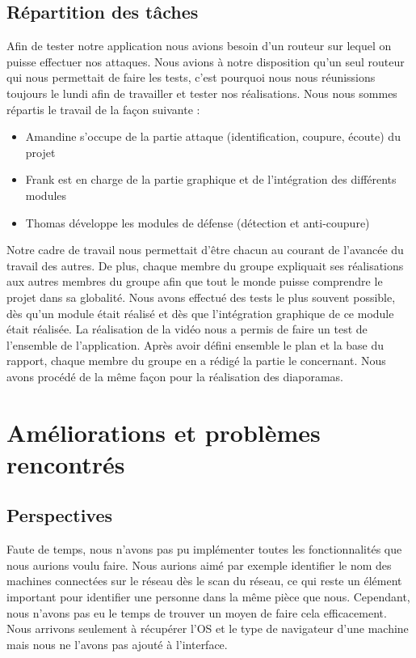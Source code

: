 \documentclass[11pt]{article}
\begin{document}
\subsection{Répartition des tâches}
Afin de tester notre application nous avions besoin d'un routeur sur lequel on puisse effectuer nos attaques. Nous avions à notre disposition qu'un seul routeur qui nous permettait de faire les tests, c'est pourquoi nous nous réunissions toujours le lundi afin de travailler et tester nos réalisations.
Nous nous sommes répartis le travail de la façon suivante :  
\begin{itemize}
	\item Amandine s'occupe de la partie attaque (identification, coupure, écoute) du projet
	\item Frank est en charge de la partie graphique et de l'intégration des différents modules
	\item Thomas développe les modules de défense (détection et anti-coupure)
\end{itemize}
Notre cadre de travail nous permettait d'être chacun au courant de l'avancée du travail des autres. De plus, chaque membre du groupe expliquait ses réalisations aux autres membres du groupe afin que tout le monde puisse comprendre le projet dans sa globalité.
Nous avons effectué des tests le plus souvent possible, dès qu'un module était réalisé et dès que l'intégration graphique de ce module était réalisée. La réalisation de la vidéo nous a permis de faire un test de l'ensemble de l'application.
Après avoir défini ensemble le plan et la base du rapport, chaque membre du groupe en a rédigé la partie le concernant. Nous avons procédé de la même façon pour la réalisation des diaporamas.


\section{Améliorations et problèmes rencontrés}
\subsection{Perspectives}
Faute de temps, nous n'avons pas pu implémenter toutes les fonctionnalités que nous aurions voulu faire. Nous aurions aimé par exemple identifier le nom des machines connectées sur le réseau dès le scan du réseau, ce qui reste un élément important pour identifier une personne dans la même pièce que nous. Cependant, nous n'avons pas eu le temps de trouver un moyen de faire cela efficacement. Nous arrivons seulement à récupérer l'OS et le type de navigateur d'une machine mais nous ne l'avons pas ajouté à l'interface.~\\
\end{document}
